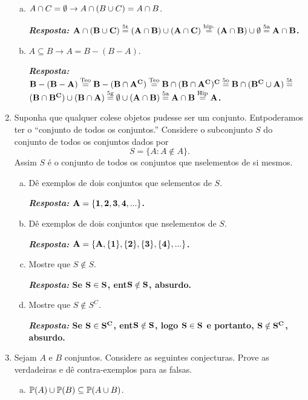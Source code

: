 \begin{enumerate}[{\bf 1.}]
\begin{enumerate}[a)]
\item $A\cap C=\emptyset \to A\cap(B\cup C)=A\cap B$.

{\bf{\it Resposta:} ${\bf A\cap(B\cup C)\stackrel{\text{5t}}{=}(A\cap B)\cup(A\cap C)\stackrel{\text{hip.}}{=}(A\cap B)\cup\emptyset\stackrel{\text{5a}}{=}A\cap B}$.}

\item $A\subseteq B \to A=B-(B-A)$.

{\bf{\it Resposta:} ${\bf B-(B-A)\stackrel{\text{Teo}}{=}B-(B\cap A^C)\stackrel{\text{Teo}}{=}B\cap(B\cap A^C)^C\stackrel{\text{5o}}{=}B\cap(B^C\cup A)\stackrel{\text{5t}}{=}}$ \\ ${\bf (B\cap B^C)\cup(B\cap A)\stackrel{\text{5g}}{=}\emptyset\cup(A\cap B)\stackrel{\text{5a}}{=}A\cap B\stackrel{\text{Hip}}{=}A}$.}
\end{enumerate}

\item Suponha que qualquer cole\cao se objetos pudesse ser um conjunto. Ent\ao poder\ih amos ter o ``conjunto de todos os conjuntos.'' Considere o subconjunto $S$ do conjunto de todos os conjuntos dados por
\[
S=\{A:A\notin A\}.
\]
Assim $S$ \'e o conjunto de todos os conjuntos que n\ao s\ao elementos de si mesmos.
\begin{enumerate}[a)]
\item D\^e exemplos de dois conjuntos que s\ao elementos de $S$.

{\bf{\it Resposta:} ${\bf A=\{1,2,3,4,...\}}$.}

\item D\^e exemplos de dois conjuntos que n\ao s\ao elementos de $S$.

{\bf{\it Resposta:} ${\bf A=\{A,\{1\},\{2\},\{3\},\{4\},...\}}$.}

\item Mostre que $S\notin S$.

{\bf{\it Resposta:} Se ${\bf S\in S}$, ent\ao ${\bf S\notin S}$, absurdo.}

\item Mostre que $S\notin S^C$.

{\bf{\it Resposta:} Se ${\bf S\in S^C}$, ent\ao ${\bf S\notin S}$, logo ${\bf S\in S}$ e portanto, ${\bf S\notin S^C}$, absurdo.}

\end{enumerate}

\item Sejam $A$ e $B$ conjuntos. Considere as seguintes conjecturas. Prove as verdadeiras e d\^e contra-exemplos para as falsas.
\begin{enumerate}[a)]
\item $\mathbb{P}(A)\cup\mathbb{P}(B)\subseteq\mathbb{P}(A\cup B)$.


\end{enumerate}
\end{enumerate}
